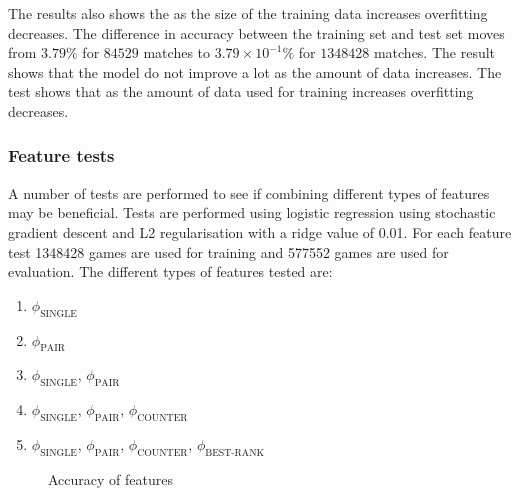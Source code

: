 The results also shows the as the size of the training data increases overfitting decreases. The difference in accuracy between the training set and test set moves from $3.79\%$ for $84529$ matches to $3.79\times10^{-1} \%$ for $1348428$ matches. The result shows that the model do not improve a lot as the amount of data increases. The test shows that as the amount of data used for training increases overfitting decreases.      


\subsubsection{Feature tests}\label{sec:feattest}
A number of tests are performed to see if combining different types of features may be beneficial.
Tests are performed using logistic regression using stochastic gradient descent and L2 regularisation with a ridge value of 0.01. 
For each feature test 1348428 games are used for training and 577552 games are used for evaluation. 
The different types of features tested are:
\begin{enumerate}
\item $\phi_\text{SINGLE}$
\item $\phi_\text{PAIR}$
\item $\phi_\text{SINGLE}$, $\phi_\text{PAIR}$
\item $\phi_\text{SINGLE}$, $\phi_\text{PAIR}$, $\phi_\text{COUNTER}$
\item $\phi_\text{SINGLE}$, $\phi_\text{PAIR}$, $\phi_\text{COUNTER}$, $\phi_\text{BEST-RANK}$
\end{enumerate}

\begin{figure}[!htb]
  \centering
   \caption{Accuracy of features}\label{fig:cluster-feat}
\end{figure}

